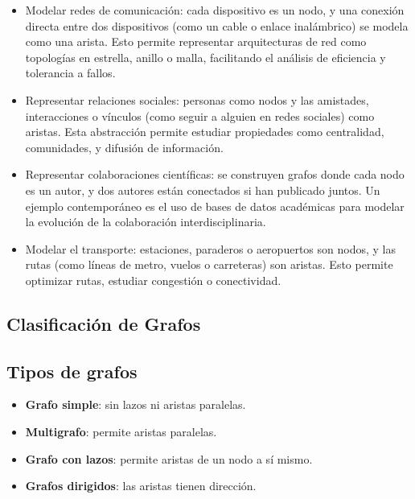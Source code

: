 \begin{itemize}
\item Modelar redes de comunicación: cada dispositivo es un nodo, y una conexión directa entre dos dispositivos (como un cable o enlace inalámbrico) se modela como una arista. Esto permite representar arquitecturas de red como topologías en estrella, anillo o malla, facilitando el análisis de eficiencia y tolerancia a fallos.

\item Representar relaciones sociales: personas como nodos y las amistades, interacciones o vínculos (como seguir a alguien en redes sociales) como aristas. Esta abstracción permite estudiar propiedades como centralidad, comunidades, y difusión de información.

\item Representar colaboraciones científicas: se construyen grafos donde cada nodo es un autor, y dos autores están conectados si han publicado juntos. Un ejemplo contemporáneo es el uso de bases de datos académicas para modelar la evolución de la colaboración interdisciplinaria.

\item Modelar el transporte: estaciones, paraderos o aeropuertos son nodos, y las rutas (como líneas de metro, vuelos o carreteras) son aristas. Esto permite optimizar rutas, estudiar congestión o conectividad.
\end{itemize}






\subsection{Clasificación de Grafos}

\subsection*{Tipos de grafos}
\begin{itemize}
\item \textbf{Grafo simple}: sin lazos ni aristas paralelas.
\item \textbf{Multigrafo}: permite aristas paralelas.
\item \textbf{Grafo con lazos}: permite aristas de un nodo a sí mismo.
\item \textbf{Grafos dirigidos}: las aristas tienen dirección.
\end{itemize}

